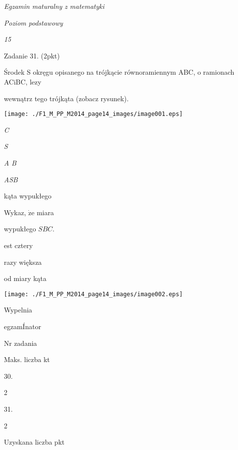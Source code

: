 \documentclass[a4paper,12pt]{article}
\begin{document}
{\it Egzamin maturalny z matematyki}

{\it Poziom podstawowy}

{\it 15}

Zadanie 31. (2pkt)

Środek S okręgu opisanego na trójkącie równoramiennym ABC, o ramionach ACiBC, lezy

wewnątrz tego trójkąta (zobacz rysunek).
\begin{center}
\texttt{[image: ./F1\_M\_PP\_M2014\_page14\_images/image001.eps]}
\end{center}
{\it C}

{\it S}

{\it A  B}

{\it ASB}

kąta wypukłego

Wykaz, $\dot{\mathrm{z}}\mathrm{e}$ miara

wypukłego $SBC.$

est cztery

razy większa

od miary kąta
\begin{center}
\texttt{[image: ./F1\_M\_PP\_M2014\_page14\_images/image002.eps]}
\end{center}
Wypelnia

egzamÍnator

Nr zadania

Maks. liczba kt

30.

2

31.

2

Uzyskana liczba pkt
\end{document}

